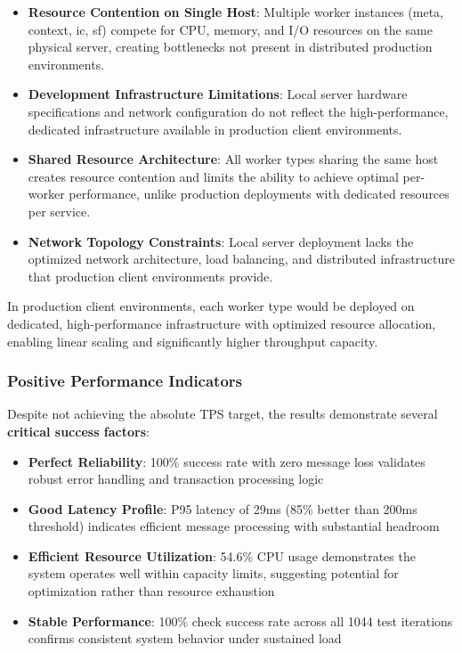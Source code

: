 \begin{itemize}
    \item \textbf{Resource Contention on Single Host}: Multiple worker instances (meta, context, ic, sf) compete for CPU, memory, and I/O resources on the same physical server, creating bottlenecks not present in distributed production environments.
    
    \item \textbf{Development Infrastructure Limitations}: Local server hardware specifications and network configuration do not reflect the high-performance, dedicated infrastructure available in production client environments.
    
    \item \textbf{Shared Resource Architecture}: All worker types sharing the same host creates resource contention and limits the ability to achieve optimal per-worker performance, unlike production deployments with dedicated resources per service.
    
    \item \textbf{Network Topology Constraints}: Local server deployment lacks the optimized network architecture, load balancing, and distributed infrastructure that production client environments provide.
\end{itemize}

In production client environments, each worker type would be deployed on dedicated, high-performance infrastructure with optimized resource allocation, enabling linear scaling and significantly higher throughput capacity.
\subsubsection{Positive Performance Indicators}
Despite not achieving the absolute TPS target, the results demonstrate several \textbf{critical success factors}:

\begin{itemize}
    \item \textbf{Perfect Reliability}: 100\% success rate with zero message loss validates robust error handling and transaction processing logic
    
    \item \textbf{Good Latency Profile}: P95 latency of 29ms (85\% better than 200ms threshold) indicates efficient message processing with substantial headroom
    
    \item \textbf{Efficient Resource Utilization}: 54.6\% CPU usage demonstrates the system operates well within capacity limits, suggesting potential for optimization rather than resource exhaustion
    
    \item \textbf{Stable Performance}: 100\% check success rate across all 1044 test iterations confirms consistent system behavior under sustained load
\end{itemize}




